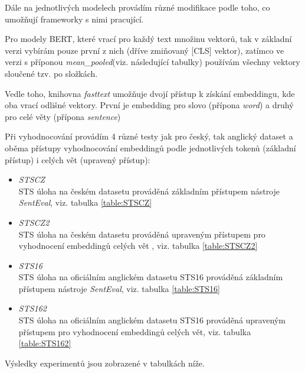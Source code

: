 \documentclass[thesis=M,czech]{FITthesis}[2019/12/23]
\begin{document}
Dále na jednotlivých modelech provádím různé modifikace podle toho, co umožňují frameworky s nimi pracující.

Pro modely BERT, které vrací pro každý text množinu vektorů, tak v základní verzi vybírám pouze první z nich (dříve zmiňovaný [CLS] vektor), zatímco ve verzi s příponou \textit{mean\_pooled}(viz. následující tabulky) používám všechny vektory sloučené tzv.  po složkách.

Vedle toho, knihovna \textit{fasttext} umožňuje dvojí přístup k získání embeddingu, kde oba vrací odlišné vektory. První je embedding pro slovo (přípona \textit{word}) a druhý pro celé věty (přípona \textit{sentence})

Při vyhodnocování provádím 4 různé testy jak pro český, tak anglický dataset a oběma přístupy vyhodnocování embeddingů podle jednotlivých tokenů (základní přístup) i celých vět (upravený přístup):

\begin{itemize}
    \item \textit{STSCZ}\\
    STS úloha na českém datasetu prováděná základním přístupem nástroje \textit{SentEval}, viz. tabulka \ref{table:STSCZ}
    \item \textit{STSCZ2}\\
    STS úloha na českém datasetu prováděná upraveným přístupem pro vyhodnocení embeddingů celých vět , viz. tabulka \ref{table:STSCZ2}
    \item \textit{STS16}\\
    STS úloha na oficiálním anglickém datasetu STS16 prováděná základním přístupem nástroje \textit{SentEval}, viz. tabulka \ref{table:STS16}
    \item \textit{STS162}\\
    STS úloha na oficiálním anglickém datasetu STS16 prováděná upraveným přístupem pro vyhodnocení embeddingů celých vět, viz. tabulka \ref{table:STS162}
\end{itemize}

Výsledky experimentů jsou zobrazené v tabulkách níže.
\end{document}
